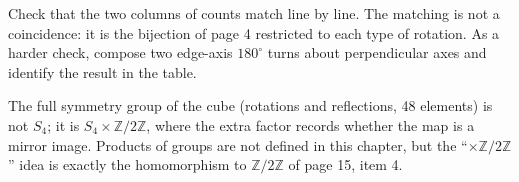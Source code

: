 \documentclass[10pt]{article}
\newcommand{\Z}{\mathbb{Z}}
\begin{document}
{\begin{minipage}[t]{420pt}
\begin{why}
\end{why}
\begin{tryit}
Check that the two columns of counts match line by line. The matching is not a coincidence: it is the bijection of page 4 restricted to each type of rotation. As a harder check, compose two edge-axis $180^\circ$ turns about perpendicular axes and identify the result in the table.
\end{tryit}
\begin{lookahead}
The full symmetry group of the cube (rotations and reflections, 48 elements) is not $S_4$; it is $S_4\times\Z/2\Z$, where the extra factor records whether the map is a mirror image. Products of groups are not defined in this chapter, but the ``$\times\Z/2\Z$'' idea is exactly the homomorphism to $\Z/2\Z$ of page 15, item 4.
\end{lookahead}
\end{minipage}
}
\end{document}
